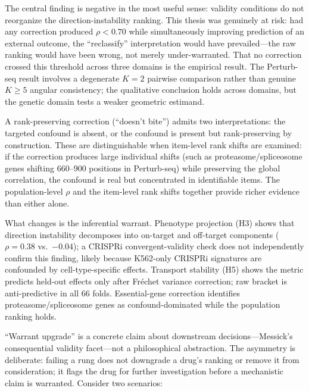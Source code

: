 \documentclass[11pt]{article}
\begin{document}
The central finding is negative in the most useful sense: validity conditions
do not reorganize the direction-instability ranking. This thesis was
genuinely at risk: had any correction produced $\rho < 0.70$ while
simultaneously improving prediction of an external outcome, the
``reclassify'' interpretation would have prevailed---the raw ranking
would have been wrong, not merely under-warranted. That no correction
crossed this threshold across three domains is the empirical result.
The Perturb-seq result involves a degenerate $K = 2$ pairwise comparison
rather than genuine $K \geq 5$ angular consistency; the qualitative
conclusion holds across domains, but the genetic domain tests a weaker
geometric estimand.

A rank-preserving correction (``doesn't bite'') admits two
interpretations: the targeted confound is absent, or the confound is
present but rank-preserving by construction. These are distinguishable
when item-level rank shifts are examined: if the correction produces
large individual shifts (such as proteasome/spliceosome genes shifting
660--900 positions in Perturb-seq) while preserving the global
correlation, the confound is real but concentrated in identifiable items.
The population-level $\rho$ and the item-level rank shifts together
provide richer evidence than either alone.

What changes is the inferential warrant. Phenotype projection (H3) shows
that direction instability decomposes into on-target and off-target
components ($\rho = 0.38$ vs.\ $-0.04$); a CRISPRi convergent-validity
check does not independently confirm this finding, likely because
K562-only CRISPRi signatures are confounded by cell-type-specific
effects. Transport stability (H5) shows
the metric predicts held-out effects only after Fr\'{e}chet variance
correction; raw bracket is anti-predictive in all 66 folds. Essential-gene
correction identifies proteasome/spliceosome genes as confound-dominated
while the population ranking holds.

``Warrant upgrade'' is a concrete claim about downstream decisions---Messick's
consequential validity facet---not a philosophical abstraction. The asymmetry
is deliberate: failing a
rung does not downgrade a drug's ranking or remove it from consideration;
it flags the drug for further investigation before a mechanistic claim
is warranted. Consider two scenarios:
\end{document}
